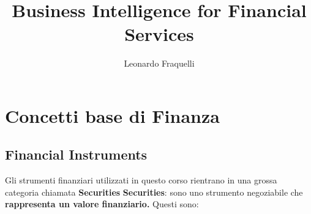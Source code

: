 \documentclass[a4paper,11pt]{report}
\title{ Business Intelligence for Financial Services}
\author {Leonardo Fraquelli }
\begin{document}
\maketitle
{%



\part{Concetti base di Finanza}
\chapter{Financial Instruments}
Gli strumenti finanziari utilizzati in questo corso rientrano in una grossa categoria chiamata {\bfseries Securities} \newline
{\bfseries Securities}: sono uno strumento negoziabile che {\bfseries rappresenta un valore finanziario.} \newline
Questi sono: 
\begin{description}    %


\end{description}}
\end{document}
